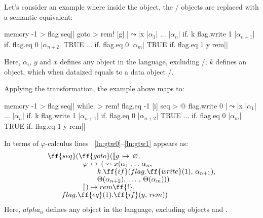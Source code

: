 \documentclass[sigplan,review,11pt,nonacm,natbib=false]{acmart}
\theoremstyle{theorems}
\newcommand\br{\\[-4pt]}
\begin{document}
Let's consider an example where inside the  object, the / objects are replaced with a semantic equivalent:
\begin{ffcode}
memory -1 > flag
seq|$\label{ln:gtw0}$|
  goto > rem!
    [g]
     |$\leadsto$|x
        |$\alpha_1$|
        ...
        |$\alpha_n$|
        if.
          k
          flag.write 1
          |$\alpha_{n+1}$|
        if.
          flag.eq 0
          |$\alpha_{n+2}$|
          TRUE
        ...
        if.
          flag.eq 0
          |$\alpha_{m}$|
          TRUE
  if.
    flag.eq 1
    y
    rem|$\label{ln:gtw1}$|
\end{ffcode}
Here, $\alpha_{i}$, $y$ and $x$ defines any object in the language, excluding /;
$k$ defines an object, which when dataized equals to a data object /.

Applying the transformation, the example above maps
to:
\begin{ffcode}
memory -1 > flag
seq|$\label{ln:tgtw0}$|
  while. > rem!
    flag.eq -1
    [i]
      seq > @
        flag.write 0
        |$\leadsto$|x
          |$\alpha_1$|
          ...
          |$\alpha_n$|
          if.
            k
            flag.write 1
            |$\alpha_{n+1}$|
          if.
            flag.eq 0
            |$\alpha_{n+2}$|
            TRUE
          ...
          if.
            flag.eq 0
            |$\alpha_{m}$|
            TRUE
  if.
    flag.eq 1
    y
    rem|$\label{ln:tgtw1}$|
\end{ffcode}

In terms of $\varphi$-calculus lines ~\ref{ln:gtw0}--\ref{ln:gtw1} appears as:
\begin{equation}
\begin{split}
& \ff{seq}(\ff{goto}(\llbracket g\,\mapsto\,\varnothing,\br
& \quad \quad \quad \quad \quad \varphi\,\mapsto\,(\,\leadsto x(\alpha_1\,\ldots\,\alpha_n, \br
& \quad \quad \quad \quad \quad \quad \quad k.\ff{if}(flag.\ff{write}(1),\,\alpha_{n+1}), \br
& \quad \quad \quad \quad \quad \quad \quad \Theta(\alpha_{n+2}),\,\ldots\,,\,\Theta(\alpha_m))) \br
& \quad \quad \quad \quad \quad \rrbracket)\mapsto rem\ff{!}, \br
& \quad \quad flag.\ff{eq}(1).\ff{if}(y,\,rem)) \\
\end{split}
\end{equation}
Here, $alpha_n$ defines any object in the language, excluding objects  and .
\end{document}
